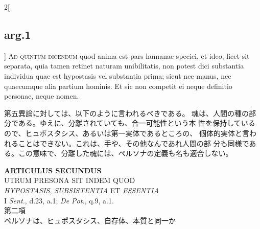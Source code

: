 \documentclass[paper=a4paper,fontsize=10pt,jafontsize=9pt,titlepage]{jlreq}
\begin{document}
\begin{paracol}{2}[\subsection{arg.1}]
{\scshape Ad quintum dicendum} quod anima est pars humanae speciei, et ideo, licet
sit separata, quia tamen retinet naturam unibilitatis, non potest dici
substantia individua quae est hypostasis vel substantia prima; sicut nec
manus, nec quaecumque alia partium hominis. Et sic non competit ei neque
definitio personae, neque nomen.

\switchcolumn

第五異論に対しては、以下のように言われるべきである。
魂は、人間の種の部分である。ゆえに、分離されていても、合一可能性という本
 性を保持しているので、ヒュポスタシス、あるいは第一実体であるところの、
 個体的実体と言われることはできない。これは、手や、その他なんであれ人間の部
 分も同様である。この意味で、分離した魂には、ペルソナの定義も名も適合しない。

\end{paracol}
\newpage
{}
{}
\setcounter{section}{2}
\setcounter{subsection}{0}




\begin{center}
 {\Large {\bfseries ARTICULUS SECUNDUS}}\\
 {\large UTRUM PRESONA SIT INDEM QUOD \\ {\itshape HYPOSTASIS}, {\itshape
 SUBSISTENTIA} ET {\itshape ESSENTIA}}\\
 {\footnotesize I {\itshape Sent.}, d.23, a.1; {\itshape De Pot.}, q.9, a.1.}\\
 {\Large 第二項\\ペルソナは、ヒュポスタシス、自存体、本質と同一か}
\end{center}
\end{document}
